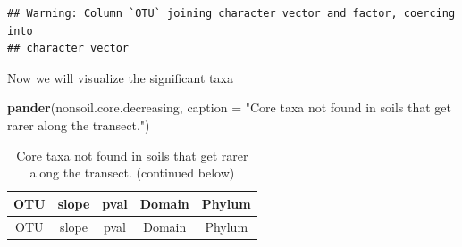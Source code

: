 \documentclass[]{article}
\newenvironment{Shaded}{\begin{snugshade}}{\end{snugshade}}
\newcommand{\DataTypeTok}[1]{\textcolor[rgb]{0.13,0.29,0.53}{#1}}
\newcommand{\KeywordTok}[1]{\textcolor[rgb]{0.13,0.29,0.53}{\textbf{#1}}}
\newcommand{\NormalTok}[1]{#1}
\newcommand{\StringTok}[1]{\textcolor[rgb]{0.31,0.60,0.02}{#1}}
\begin{document}
\begin{verbatim}
## Warning: Column `OTU` joining character vector and factor, coercing into
## character vector
\end{verbatim}

Now we will visualize the significant taxa

\begin{Shaded}
\begin{Highlighting}[]
\KeywordTok{pander}\NormalTok{(nonsoil.core.decreasing, }\DataTypeTok{caption =} \StringTok{"Core taxa not found in soils that get rarer along the transect."}\NormalTok{)}
\end{Highlighting}
\end{Shaded}

\begin{longtable}[]{@{}ccccc@{}}
\caption{Core taxa not found in soils that get rarer along the transect.
(continued below)}\tabularnewline
\toprule
\begin{minipage}[b]{0.13\columnwidth}\centering
OTU\strut
\end{minipage} & \begin{minipage}[b]{0.16\columnwidth}\centering
slope\strut
\end{minipage} & \begin{minipage}[b]{0.13\columnwidth}\centering
pval\strut
\end{minipage} & \begin{minipage}[b]{0.13\columnwidth}\centering
Domain\strut
\end{minipage} & \begin{minipage}[b]{0.29\columnwidth}\centering
Phylum\strut
\end{minipage}\tabularnewline
\midrule
\endfirsthead
\toprule
\begin{minipage}[b]{0.13\columnwidth}\centering
OTU\strut
\end{minipage} & \begin{minipage}[b]{0.16\columnwidth}\centering
slope\strut
\end{minipage} & \begin{minipage}[b]{0.13\columnwidth}\centering
pval\strut
\end{minipage} & \begin{minipage}[b]{0.13\columnwidth}\centering
Domain\strut
\end{minipage} & \begin{minipage}[b]{0.29\columnwidth}\centering
Phylum\strut
\end{minipage}\tabularnewline
\midrule

\end{longtable}
\end{document}
